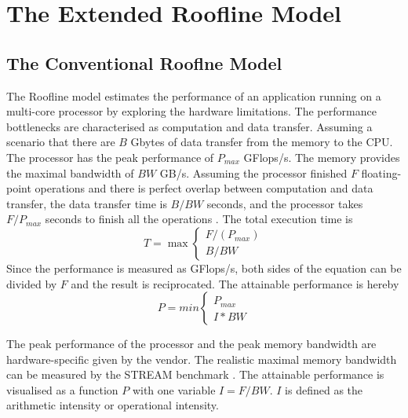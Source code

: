 \chapter{The Extended Roofline Model}
\section{The Conventional Rooflne Model}

The Roofline model estimates the performance of an application running on a multi-core processor by exploring the hardware limitations. The performance bottlenecks are characterised as computation and data transfer. Assuming a scenario that there are $B$ Gbytes of data transfer from the memory to the CPU. The processor has the peak performance of $P_{max}$ GFlops/s. The memory provides the maximal bandwidth of $BW$ GB/s. Assuming the processor finished $F$ floating-point operations and there is perfect overlap between computation and data transfer, the data transfer time is $B/BW$ seconds, and the processor takes $F/P_{max}$ seconds to finish all the operations \cite{12}. The total execution time is 
\begin{equation}
T = \max \begin{cases}
{F/(P_{max})}\\
{B/BW}
\end{cases}
\end{equation}
Since the performance is measured as GFlops/s, both sides of the equation can be divided by $F$ and the result is reciprocated. The attainable performance is hereby 
\begin{equation}
P = min\begin{cases}
{P_{max}}\\
{I*BW}
\end{cases}
\end{equation}

The peak performance of the processor and the peak memory bandwidth are hardware-specific given by the vendor. The realistic maximal memory bandwidth can be measured by the STREAM benchmark \cite{12}. The attainable performance is visualised as a function $P$ with one variable  $I = F/BW$. $I$ is defined as the arithmetic intensity or operational intensity. 


